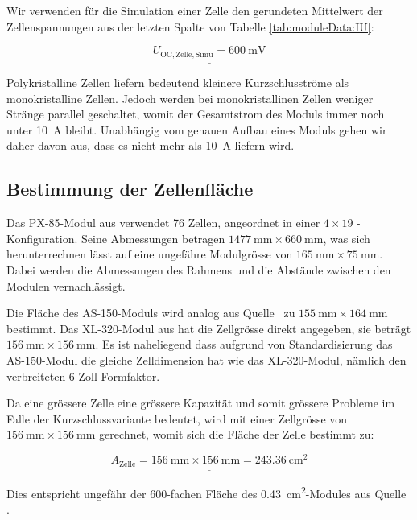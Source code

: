 Wir verwenden f\"ur  die Simulation einer Zelle den  gerundeten Mittelwert der
Zellenspannungen aus der letzten Spalte von Tabelle \ref{tab:moduleData:IU}:

\begin{equation}
    \label{eq:cell:UOC}
    \underline{\underline{U_{\mathrm{OC, Zelle, Simu}} = \SI{600}{\milli\volt}}}
\end{equation}

Polykristalline  Zellen  liefern  bedeutend  kleinere  Kurzschlusstr\"ome  als
monokristalline  Zellen.  Jedoch  werden bei  monokristallinen Zellen  weniger
Str\"ange parallel  geschaltet, womit  der Gesamtstrom  des Moduls  immer noch
unter \SI{10}{\ampere}  bleibt. Unabh\"angig vom  genauen Aufbau  eines Moduls
gehen wir  daher davon aus,  dass es  nicht mehr als  \SI{10}{\ampere} liefern
wird.


\subsection{Bestimmung der Zellenfl\"ache}
\label{app:subsec:cell:surface}

Das    PX-85-Modul   aus    \cite{ref:solar:px85}    verwendet   76    Zellen,
angeordnet  in   einer  $4  \times  19$   -  Konfiguration. Seine  Abmessungen
betragen   $\SI{1477}{\milli\meter}    \times   \SI{660}{\milli\meter}$,   was
sich   herunterrechnen  l\"asst   auf  eine   ungef\"ahre  Modulgr\"osse   von
$\SI{165}{\milli\meter}   \times   \SI{75}{\milli\meter}$. Dabei  werden   die
Abmessungen   des   Rahmens   und   die  Abst\"ande   zwischen   den   Modulen
vernachl\"assigt.

Die Fl\"ache  des AS-150-Moduls wird analog  aus Quelle~\cite{ref:solar:as150}
zu  $\SI{155}{\milli\meter}  \times   \SI{164}{\milli\meter}$  bestimmt.   Das
XL-320-Modul   aus   \cite{ref:solar:sunmodulePro}    hat   die   Zellgr\"osse
direkt    angegeben,    sie     betr\"agt    $\SI{156}{\milli\meter}    \times
\SI{156}{\milli\meter}$. Es ist naheliegend dass aufgrund von Standardisierung
das AS-150-Modul die gleiche Zelldimension hat wie das XL-320-Modul, n\"amlich
den verbreiteten 6-Zoll-Formfaktor.

Da  eine gr\"ossere  Zelle eine  gr\"ossere Kapazit\"at  und somit  gr\"ossere
Probleme   im  Falle   der  Kurzschlussvariante   bedeutet,  wird   mit  einer
Zellgr\"osse   von   $\SI{156}{\milli\meter}  \times   \SI{156}{\milli\meter}$
gerechnet, womit sich die Fl\"ache der Zelle bestimmt zu:

\begin{equation}
    \label{eq:cell:surface}
    \underline{\underline{A_{\mathrm{Zelle}} = \SI{156}{\milli\meter} \times \SI{156}{\milli\meter} = \SI{243.36}{\centi\meter\squared}}}
\end{equation}

Dies     entspricht     ungef\"ahr     der     600-fachen     Fl\"ache     des
\SI{0.43}{\centi\meter\squared}-Modules aus  Quelle \cite{ref:solar:scofield}.

